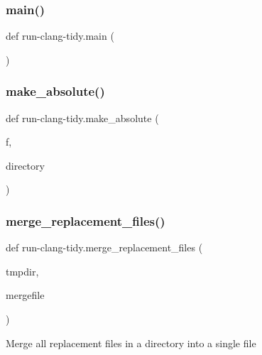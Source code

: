 \subsubsection{\texorpdfstring{main()}{main()}}
{\footnotesize\ttfamily def run-\/clang-\/tidy.\+main (\begin{DoxyParamCaption}{ }\end{DoxyParamCaption})}

\mbox{\label{namespacerun-clang-tidy_a0cea255a2d9edf0a7f877bd9bdd4c75f}} 
\subsubsection{\texorpdfstring{make\+\_\+absolute()}{make\_absolute()}}
{\footnotesize\ttfamily def run-\/clang-\/tidy.\+make\+\_\+absolute (\begin{DoxyParamCaption}\item[{}]{f,  }\item[{}]{directory }\end{DoxyParamCaption})}

\mbox{\label{namespacerun-clang-tidy_ad3aaf1ecd87ad237a6e5caeeaa4a6ad6}} 
\subsubsection{\texorpdfstring{merge\+\_\+replacement\+\_\+files()}{merge\_replacement\_files()}}
{\footnotesize\ttfamily def run-\/clang-\/tidy.\+merge\+\_\+replacement\+\_\+files (\begin{DoxyParamCaption}\item[{}]{tmpdir,  }\item[{}]{mergefile }\end{DoxyParamCaption})}

\begin{DoxyVerb}Merge all replacement files in a directory into a single file\end{DoxyVerb}
 \mbox{\label{namespacerun-clang-tidy_a586db901d7ae78f0db162034b23cf68e}} 
